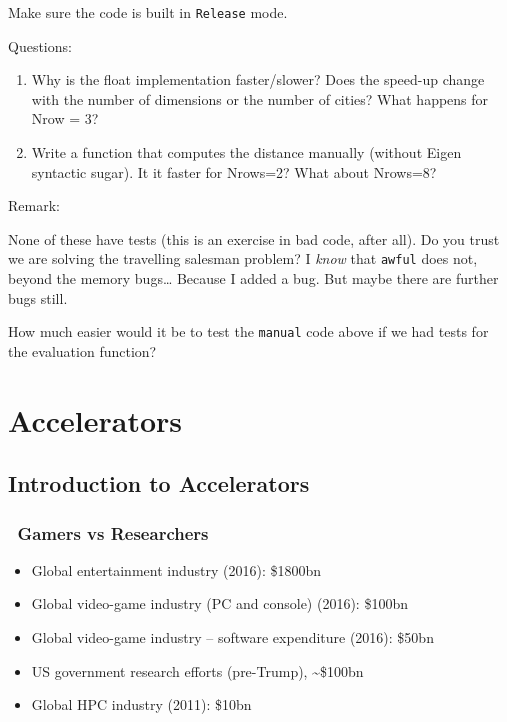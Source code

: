 Make sure the code is built in \texttt{Release} mode.

Questions:

\begin{enumerate}
\def\labelenumi{\arabic{enumi}.}
\itemsep1pt\parskip0pt
\item
  Why is the float implementation faster/slower? Does the speed-up
  change with the number of dimensions or the number of cities? What
  happens for Nrow = 3?
\item
  Write a function that computes the distance manually (without Eigen
  syntactic sugar). It it faster for Nrows=2? What about Nrows=8?
\end{enumerate}

Remark:

None of these have tests (this is an exercise in bad code, after all).
Do you trust we are solving the travelling salesman problem? I
\emph{know} that \texttt{awful} does not, beyond the memory bugs\ldots{}
Because I added a bug. But maybe there are further bugs still.

How much easier would it be to test the \texttt{manual} code above if we
had tests for the evaluation function?

\section{Accelerators}\label{accelerators}

\subsection{Introduction to
Accelerators}\label{introduction-to-accelerators}

\subsubsection{~Gamers vs Researchers}\label{gamers-vs-researchers}

\begin{itemize}
\itemsep1pt\parskip0pt
\item
  Global entertainment industry (2016): \$1800bn
\item
  Global video-game industry (PC and console) (2016): \$100bn
\item
  Global video-game industry -- software expenditure (2016): \$50bn
\item
  US government research efforts (pre-Trump), \textasciitilde{}\$100bn
\item
  Global HPC industry (2011): \$10bn
\end{itemize}

